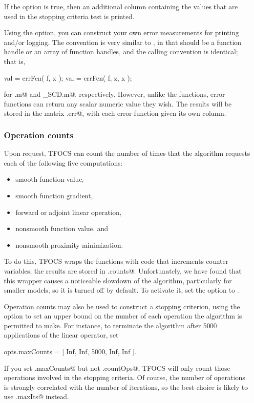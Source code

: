 \documentclass{article}
\newcommand{\<}{\langle}
\renewcommand{\>}{\rangle}
\begin{document}
If the \verb@printStopcrit@ option is true, then an additional column containing
the values that are used in the stopping criteria test is printed.

Using the \verb@errFcn@ option, you can construct your own error measurements
for printing and/or logging. The convention is very similar to \verb@stopFcn@,
in that \verb@errFcn@ should be a function handle or an array of function handles,
and the calling convention is identical; that is,
\begin{code}
	val = errFcn( f, x );
	val = errFcn( f, z, x );
\end{code}
for \verb@tfocs.m@ and \verb@tfocs_SCD.m@, respectively.
However, unlike the \verb@stopFcn@ functions, error functions can return
any scalar numeric value they wish. The results will be stored in the matrix
\verb@out.err@, with each error function given its own column.

\subsubsection{Operation counts}
\label{sec:opcounts}

Upon request, TFOCS can count the number of times that the algorithm requests each of the following
five computations:
\begin{itemize}
\itemsep 0pt
\item smooth function value,
\item smooth function gradient,
\item forward or adjoint linear operation,
\item nonsmooth function value, and
\item nonsmooth proximity minimization.
\end{itemize}
To do this, TFOCS wraps the functions with code that
increments counter variables; the results are stored in \verb@out.counts@.
Unfortunately, we have found that this wrapper causes
a noticeable slowdown of the 
algorithm, particularly for smaller models, so it is turned off by default.
To activate it, set the \verb@countOpts@ option to \verb@true@. 

Operation counts may also be used to construct a stopping criterion,
using the \verb@maxCounts@ option to set an upper bound on the number
of each operation the algorithm is permitted to make.
For instance, to terminate the algorithm after 5000 applications
of the linear operator, set
\begin{code}
	opts.maxCounts = [ Inf, Inf, 5000, Inf, Inf ].
\end{code}
If you set \verb@opts.maxCounts@ but not \verb@opts.countOps@,
TFOCS will only count those operations involved in the stopping criteria.
Of course, the number of operations is strongly correlated with
the number of iterations, so the best choice is likely to use
\verb@opts.maxIts@ instead.
\end{document}
